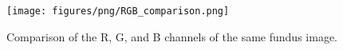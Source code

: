 \begin{figure}[b]
    \centering
    \texttt{[image: figures/png/RGB\_comparison.png]}
    \caption{Comparison of the R, G, and B channels of the same fundus image.}
    \label{fig:RGB comparison}
\end{figure}